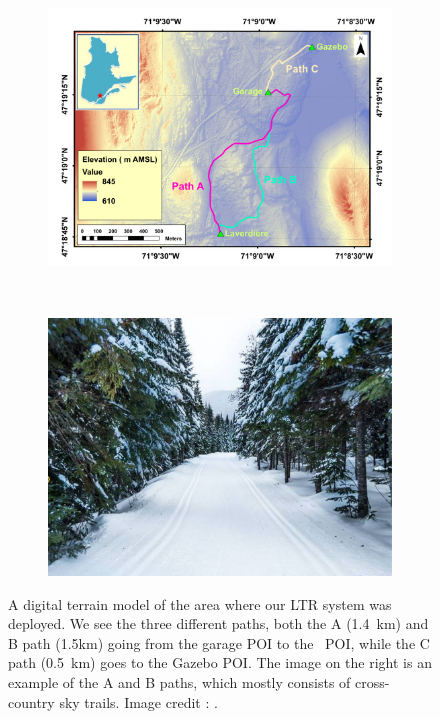\begin{figure}[htpb]
	\begin{center}
		\begin{subfigure}[b]{0.45\textwidth}
			\includegraphics[width=\linewidth]{figs/map-dem.pdf}
			\label{fig:view_above}
		\end{subfigure}%
		~~
		\begin{subfigure}[b]{0.45\textwidth}
			\includegraphics[width=\linewidth]{figs/foret-montmorency-path.pdf}
			\label{fig:view_path}
		\end{subfigure}%
		\caption{A digital terrain model of the area where our \ac{LTR} system was deployed.
		We see the three different paths, both the A (\SI{1.4}{km}) and B path ({1.5}{km}) going from the garage \ac{POI} to the \laverdiere~\ac{POI}, while the C path (\SI{0.5}{km}) goes to the Gazebo \ac{POI}.
		The image on the right is an example of the A and B paths, which mostly consists of cross-country sky trails.
		Image credit : \foretmo.} 
		\label{fig:forest}
	\end{center}
\end{figure}

